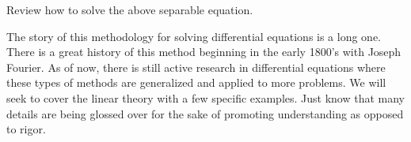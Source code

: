 \begin{exercise}
	Review how to solve the above separable equation.
\end{exercise}

\begin{remark}
	The story of this methodology for solving differential equations is a long one.  There is a great history of this method beginning in the early 1800's with Joseph Fourier.  As of now, there is still active research in differential equations where these types of methods are generalized and applied to more problems.  We will seek to cover the linear theory with a few specific examples. Just know that many details are being glossed over for the sake of promoting understanding as opposed to rigor.
\end{remark}